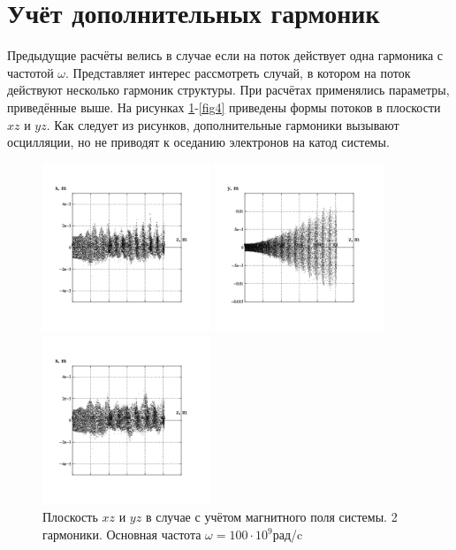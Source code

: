\documentclass[a4paper,14pt]{extreport} %
\begin{document}
\section{Учёт дополнительных гармоник}

Предыдущие расчёты велись в случае если на поток действует одна гармоника с частотой $\omega$. Представляет интерес рассмотреть случай, в котором на поток действуют несколько гармоник структуры. При расчётах применялись параметры, приведённые выше. На рисунках \ref{fig3}-\ref{fig4} приведены формы потоков в плоскости $xz$ и $yz$. Как следует из рисунков, дополнительные гармоники вызывают осцилляции, но не приводят к оседанию электронов на катод системы.

\begin{figure}[!ht]
	\parbox{0.48\textwidth}{
		\includegraphics[width = 0.45\textwidth]{images/png/withmf/2x100xz.png}
	}
	\parbox{0.48\textwidth}{
		\includegraphics[width = 0.45\textwidth]{images/png/withmf/2x100yz.png}
	}
	\caption{Плоскость $xz$ и $yz$ в случае с учётом магнитного поля системы. 2 гармоники. Основная частота	$\omega = 100\cdot10^9$рад/c}
	\label{fig3}
	\parbox{0.48\textwidth}{
		\includegraphics[width = 0.45\textwidth]{images/png/withmf/3x50xz.png}
}
\end{figure}
\end{document}
